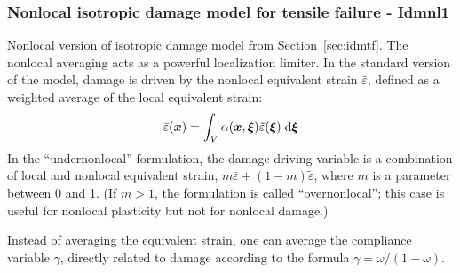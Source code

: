 \documentclass[a4paper]{article}
\newcommand{\mbf}[1]{\mbox{\boldmath$#1$}}
\begin{document}
\subsubsection{Nonlocal isotropic damage model for tensile failure - Idmnl1}
\label{sec:nidm}
Nonlocal version of isotropic damage model from Section~\ref{sec:idmtf}.
The nonlocal averaging acts as a powerful localization
limiter. 
In the standard version of the model, 
damage is driven by the nonlocal equivalent strain $\bar{\varepsilon}$, 
defined as a weighted average of the local equivalent strain:
$$
\bar{\varepsilon}(\mbf{x}) = \int_V\alpha(\mbf{x},\mbf{\xi})\tilde\varepsilon(\mbf{\xi})\;{\rm d}\mbf{\xi}
$$
In the ``undernonlocal'' formulation, the damage-driving variable is a 
combination of local and nonlocal equivalent strain, 
$m\bar{\varepsilon}+(1-m)\tilde\varepsilon$, where $m$ is a parameter between
0 and 1. (If $m>1$, the formulation is called ``overnonlocal''; this case
is useful for nonlocal plasticity but not for nonlocal damage.) 

Instead
of averaging the equivalent strain, one can average the compliance variable
$\gamma$, directly related to damage according to the formula 
$\gamma=\omega/(1-\omega)$.
\end{document}

